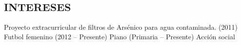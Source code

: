 \documentclass[margin]{res}
\begin{document}
\begin{resume}




\section{INTERESES}
Proyecto extracurricular de filtros de Arsénico para agua contaminada. (2011)
\\Futbol femenino (2012 – Presente) Piano (Primaria – Presente) Acción social

\end{resume}
\end{document}
